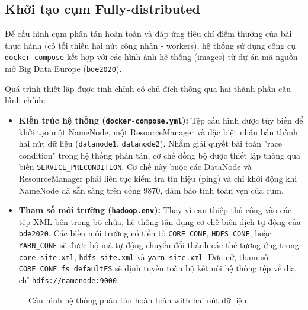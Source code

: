 \subsection{Khởi tạo cụm Fully-distributed}
Để cấu hình cụm phân tán hoàn toàn và đáp ứng tiêu chí điểm thưởng của bài thực hành (có tối thiểu hai nút công nhân - workers), hệ thống sử dụng công cụ \texttt{docker-compose} kết hợp với các hình ảnh hệ thống (images) từ dự án mã nguồn mở Big Data Europe (\texttt{bde2020}).

Quá trình thiết lập được tinh chỉnh có chủ đích thông qua hai thành phần cấu hình chính:

\begin{itemize}
    \item \textbf{Kiến trúc hệ thống (\texttt{docker-compose.yml}):} Tệp cấu hình được tùy biến để khởi tạo một NameNode, một ResourceManager và đặc biệt nhân bản thành hai nút dữ liệu (\texttt{datanode1}, \texttt{datanode2}). Nhằm giải quyết bài toán "race condition" trong hệ thống phân tán, cơ chế đồng bộ được thiết lập thông qua biến \texttt{SERVICE\_PRECONDITION}. Cơ chế này buộc các DataNode và ResourceManager phải liên tục kiểm tra tín hiệu (ping) và chỉ khởi động khi NameNode đã sẵn sàng trên cổng 9870, đảm bảo tính toàn vẹn của cụm.
    \item \textbf{Tham số môi trường (\texttt{hadoop.env}):} Thay vì can thiệp thủ công vào các tệp XML bên trong bộ chứa, hệ thống tận dụng cơ chế biên dịch tự động của \texttt{bde2020}. Các biến môi trường có tiền tố \texttt{CORE\_CONF}, \texttt{HDFS\_CONF}, hoặc \texttt{YARN\_CONF} sẽ được bộ mã tự động chuyển đổi thành các thẻ tương ứng trong \texttt{core-site.xml}, \texttt{hdfs-site.xml} và \texttt{yarn-site.xml}. Đơn cử, tham số \texttt{CORE\_CONF\_fs\_defaultFS} sẽ định tuyến toàn bộ kết nối hệ thống tệp về địa chỉ \texttt{hdfs://namenode:9000}.
\end{itemize}

\begin{figure}[H]
    \centering
    \caption{Cấu hình hệ thống phân tán hoàn toàn with hai nút dữ liệu.}
    \label{fig:fully_config}
\end{figure}

